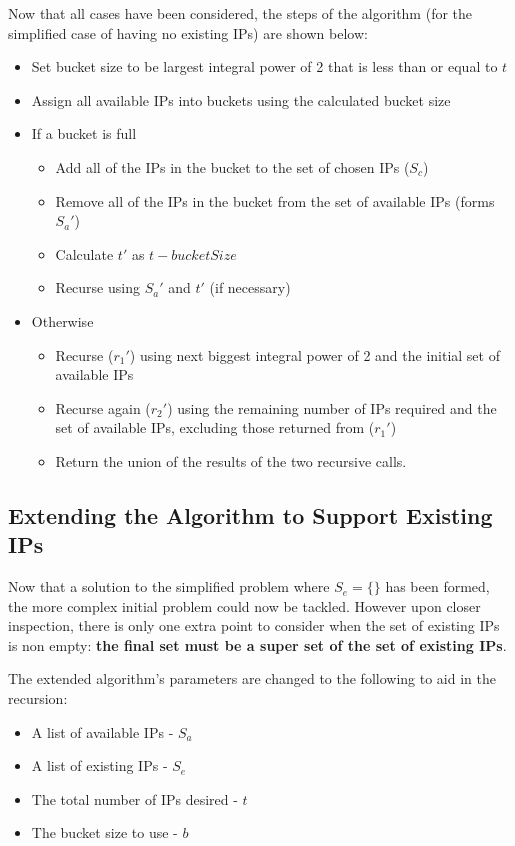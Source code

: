 Now that all cases have been considered, the steps of the algorithm (for the simplified case of having no existing IPs) are shown below:
\begin{itemize}
\item{Set bucket size to be largest integral power of 2 that is less than or equal to $t$}
\item{Assign all available IPs into buckets using the calculated bucket size}
\item{If a bucket is full}
  \begin{itemize}
  \item{Add all of the IPs in the bucket to the set of chosen IPs ($S_c$)}
  \item{Remove all of the IPs in the bucket from the set of available IPs (forms $S_a'$)}
  \item{Calculate $t'$ as $t - bucketSize$}
  \item{Recurse using $S_a'$ and $t'$ (if necessary)}
  \end{itemize}
\item{Otherwise}
  \begin{itemize}
  \item{Recurse ($r_1'$) using next biggest integral power of 2 and the initial set of available IPs}
  \item{Recurse again ($r_2'$) using the remaining number of IPs required and the set of available IPs, excluding those returned from ($r_1'$)}
  \item{Return the union of the results of the two recursive calls.}
  \end{itemize}
\end{itemize}

\subsection{Extending the Algorithm to Support Existing IPs}
Now that a solution to the simplified problem where $S_e = \{\}$ has been formed, the more complex initial problem could now be tackled. However upon closer inspection, there is only one extra point to consider when the set of existing IPs is non empty: \textbf{the final set must be a super set of the set of existing IPs}. 

The extended algorithm's parameters are changed to the following to aid in the recursion:

\begin{itemize}
\item{A list of available IPs - $S_a$}
\item{A list of existing IPs - $S_e$}
\item{The total number of IPs desired - $t$}
\item{The bucket size to use - $b$}
\end{itemize}

